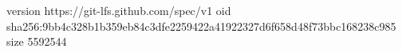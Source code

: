 version https://git-lfs.github.com/spec/v1
oid sha256:9bb4c328b1b359eb84c3dfe2259422a41922327d6f658d48f73bbc168238c985
size 5592544
